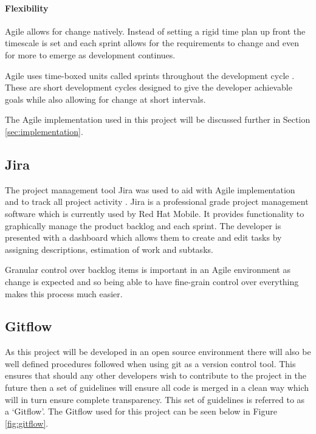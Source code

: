 \paragraph{Flexibility} Agile allows for change natively. Instead of setting a rigid time plan up front the timescale is set and each \gls{sprint} allows for the requirements to change and even for more to emerge as development continues.

Agile uses time-boxed units called \gls{sprint}s throughout the development cycle \citep{Agile2016}. These are short development cycles designed to give the developer achievable goals while also allowing for change at short intervals.

The Agile implementation used in this project will be discussed further in Section \ref{sec:implementation}.

\subsection{Jira}
\label{sub:jira}
The project management tool Jira was used to aid with Agile implementation and to track all project activity \citep{JBoss2016}. Jira is a professional grade project management software which is currently used by Red Hat Mobile. It provides functionality to graphically manage the product backlog and each \gls{sprint}. The developer is presented with a dashboard which allows them to create and edit tasks by assigning descriptions, estimation of work and subtasks.

Granular control over backlog items is important in an Agile environment as change is expected and so being able to have fine-grain control over everything makes this process much easier.
\subsection{Gitflow}
\label{sub:gitflow}
As this project will be developed in an open source environment there will also be well defined procedures followed when using \gls{git} as a version control tool. This ensures that should any other developers wish to contribute to the project in the future then a set of guidelines will ensure all code is merged in a clean way which will in turn ensure complete transparency. This set of guidelines is referred to as a `Gitflow'. The Gitflow used for this project can be seen below in Figure \ref{fig:gitflow}.

